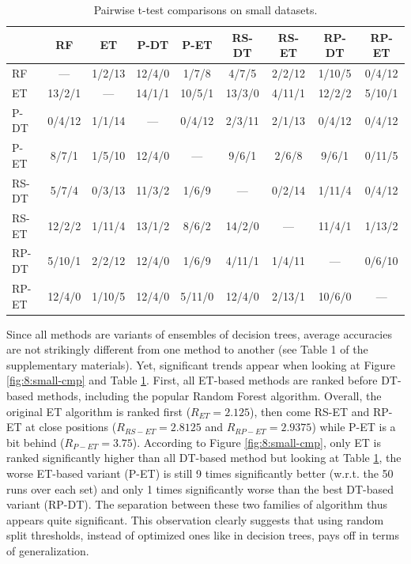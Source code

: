 \begin{table}
    \centering
    \footnotesize
  \begin{tabular}{|l|cccccccc|}
    \hline
         & RF & ET & P-DT & P-ET & RS-DT & RS-ET & RP-DT & RP-ET \\
    \hline
    \hline
        RF     &  ---   & 1/2/13 & 12/4/0  & 1/7/8   & 4/7/5   & 2/2/12 & 1/10/5  & 0/4/12 \\
        ET     &  13/2/1 & ---   & 14/1/1  & 10/5/1  & 13/3/0  & 4/11/1 & 12/2/2  & 5/10/1 \\
        P-DT   &  0/4/12 & 1/1/14 & ---    & 0/4/12  & 2/3/11  & 2/1/13 & 0/4/12  & 0/4/12 \\
        P-ET   &  8/7/1  & 1/5/10 & 12/4/0  & ---    & 9/6/1   & 2/6/8  & 9/6/1   & 0/11/5 \\
        RS-DT  &  5/7/4  & 0/3/13 & 11/3/2  & 1/6/9   & ---    & 0/2/14 & 1/11/4  & 0/4/12 \\
        RS-ET  &  12/2/2 & 1/11/4 & 13/1/2  & 8/6/2   & 14/2/0  & ---   & 11/4/1  & 1/13/2 \\
        RP-DT  &  5/10/1 & 2/2/12 & 12/4/0  & 1/6/9   & 4/11/1  & 1/4/11 & ---    & 0/6/10 \\
        RP-ET  &  12/4/0 & 1/10/5 & 12/4/0  & 5/11/0  & 12/4/0  & 2/13/1 & 10/6/0  & ---\\
    \hline
    \end{tabular}
    \caption{Pairwise t-test comparisons on small datasets.}
    \label{table:rp:small-ttest}
\end{table}


Since all methods are variants of ensembles of decision trees, average
accuracies are not strikingly different from one method to another (see Table 1
of the supplementary materials). Yet, significant trends appear when looking at
Figure \ref{fig:8:small-cmp} and Table \ref{table:rp:small-ttest}.  First, all ET-based
methods are ranked before DT-based methods, including the popular Random
Forest algorithm. Overall, the original ET algorithm is ranked first ($R_{ET} =
2.125$), then come RS-ET and RP-ET at close positions ($R_{RS-ET} = 2.8125$ and
$R_{RP-ET} = 2.9375$) while P-ET is a bit behind ($R_{P-ET} = 3.75$). According
to Figure \ref{fig:8:small-cmp}, only ET is ranked significantly higher than all
DT-based method but looking at Table \ref{table:rp:small-ttest}, the worse ET-based
variant (P-ET) is still 9 times significantly better (w.r.t. the 50
runs over each set) and only 1 times significantly worse than the best DT-based
variant (RP-DT). The separation between these two families of algorithm
thus appears quite significant. This observation clearly suggests that using
random split thresholds, instead of optimized ones like in decision trees, pays
off in terms of generalization.

